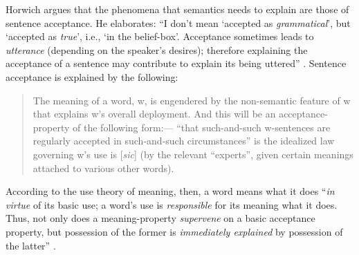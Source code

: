 \largerpage
Horwich argues that the phenomena that semantics needs to explain are those of sentence acceptance. He elaborates: “I don’t mean ‘accepted as \textit{grammatical}’, but ‘accepted as \textit{true}’, i.e., ‘in the belief-box’. Acceptance sometimes leads to \textit{utterance} (depending on the speaker’s desires); therefore explaining the acceptance of a sentence may contribute to explain its being uttered” \citep[315, fn. 9, emphasis in original]{Horwich2008}. Sentence acceptance is explained by the following:
\begin{quote}
The meaning of a word, w, is engendered by the non-semantic feature of w that explains w’s overall deployment. And this will be an acceptance-property of the following form:— “that such-and-such w-sentences are regularly accepted in such-and-such circumstances” is the idealized law governing w’s use is [\textit{sic}] (by the relevant “experts”, given certain meanings attached to various other words). \citep[28]{Horwich2005}
\end{quote}
According to the use theory of meaning, then, a word means what it does “\textit{in virtue} of its basic use; a word’s use is \textit{responsible} for its meaning what it does. Thus, not only does a meaning-property \textit{supervene} on a basic acceptance property, but possession of the former is \textit{immediately explained} by possession of the latter” \citep[32, emphasis in original]{Horwich2005}.


